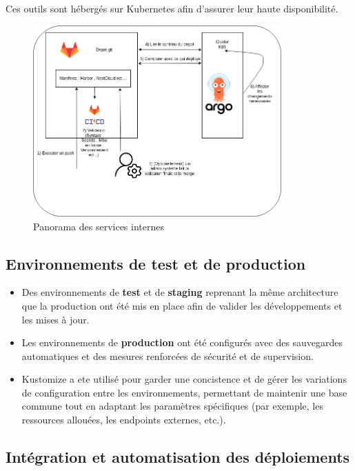 Ces outils sont hébergés sur Kubernetes afin d’assurer leur haute disponibilité.

\begin{figure}[H]
	\centering
	\includegraphics[width=0.85\textwidth]{figures/services-internes.png}
	\caption{Panorama des services internes}
\end{figure}

\subsection{Environnements de test et de production}

\begin{itemize}
	\item Des environnements de \textbf{test} et de \textbf{staging} reprenant la même architecture que la production ont été mis en place afin de valider les développements et les mises à jour.
	\item Les environnements de \textbf{production} ont été configurés avec des sauvegardes automatiques et des mesures renforcées de sécurité et de supervision.
	\item Kustomize a ete utilisé pour garder une concistence et de gérer les variations de configuration entre les environnements, permettant de maintenir une base commune tout en adaptant les paramètres spécifiques (par exemple, les ressources allouées, les endpoints externes, etc.).
\end{itemize}

\subsection{Intégration et automatisation des déploiements}

